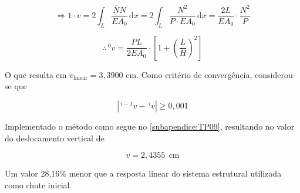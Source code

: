 \begin{textocaixa}
$$\Longrightarrow 1\cdot v = 2\int_L \frac{\overline{N} N}{EA_0}\,\mathrm{d}x
= 2\int_L \frac{N^2}{P\cdot EA_0}\,\mathrm{d}x
= \frac{2L}{EA_0}\cdot \frac{N^2}{P}$$

\begin{equation}
	\therefore \boxed{\,^0 v = \frac{PL}{2EA_0}\cdot
							   \left[1 + \left(\frac{L}{H}\right)^2\right]}
	\label{eq:TP9-v_init}
\end{equation}

O que resulta em $v_\text{linear} = 3,3900$ cm. Como critério de convergência,
considerou-se que

\begin{equation}
	\left|\,^{i-1}v - \,^i v\right| \geq 0,001
	\label{eq:TP9-convergencia}
\end{equation}

Implementado o método como segue no \autoref{subapendice:TP09}, resultando no valor do
deslocamento vertical de

$$\boxed{v = 2{,}4355\:\:\text{cm}}$$

Um valor 28,16\% menor que a resposta linear do sistema estrutural utilizada como chute inicial.


\end{textocaixa}
